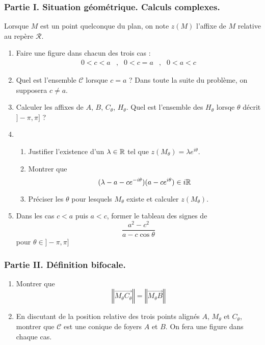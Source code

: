 \subsubsection*{Partie I. Situation géométrique. Calculs complexes.}
Lorsque $M$ est un point quelconque du plan, on note $z(M)$ l'affixe de $M$ relative au repère $\mathcal R$.
\begin{enumerate}
 \item Faire une figure dans chacun des trois cas :
\begin{align*}
 0<c<a &,& 0<c=a &,& 0<a<c
\end{align*}
\item Quel est l'ensemble $\mathcal C$ lorsque $c=a$ ? Dans toute la suite du problème, on supposera $c\neq a$.
\item Calculer les affixes de $A$, $B$, $C_\theta$, $H_\theta$. Quel est l'ensemble des $H_\theta$ lorsqe $\theta$ décrit $]-\pi,\pi]$ ?
\item 
\begin{enumerate}
 \item Justifier l'existence d'un $\lambda \in \mathbb{R}$ tel que $z(M_\theta)=\lambda e^{i\theta}$.
 \item Montrer que
\begin{displaymath}
 (\lambda-a-ce^{-i\theta})(a-ce^{i\theta}) \in i \mathbb{R}
\end{displaymath}
\item Préciser les $\theta$ pour lesquels $M_\theta$ existe et calculer $z(M_\theta)$.
\end{enumerate}
\item Dans les cas $c<a$ puis $a<c$, former le tableau des signes de
\begin{displaymath}
 \frac{a^2-c^2}{a-c\cos \theta}
\end{displaymath}
pour $\theta \in ]-\pi,\pi]$
\end{enumerate}
\subsubsection*{Partie II. Définition bifocale.}
\begin{enumerate}
 \item Montrer que
\begin{displaymath}
 \left \Vert \overrightarrow{M_\theta C_\theta}\right\Vert = \left \Vert \overrightarrow{M_\theta B}\right\Vert 
\end{displaymath}
\item En discutant de la position relative des trois points alignés $A$, $M_\theta$ et $C_\theta$, montrer que $\mathcal C$ est une conique de foyers $A$ et $B$. On fera une figure dans chaque cas.
\end{enumerate}
